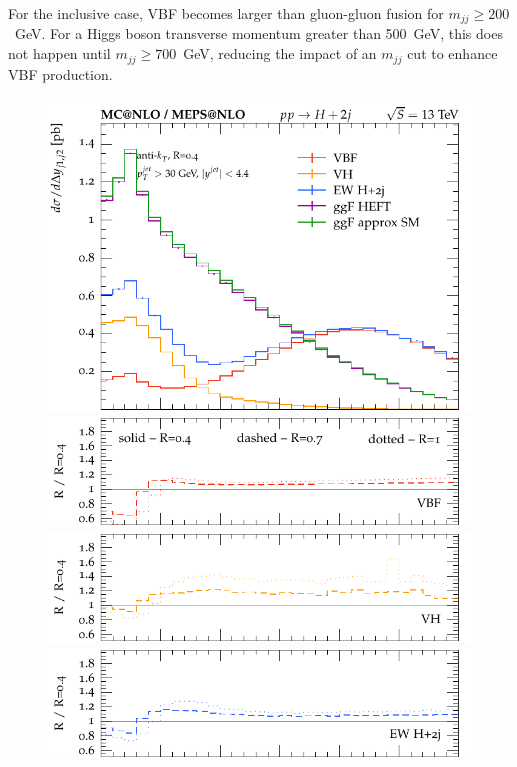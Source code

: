 \documentclass[10pt,prd,fleqn,superscriptaddress,notitlepage,nofootinbib,preprintnumbers,nobalancelastpage]{revtex4-1}
\newcommand{\VBF}{VBF\xspace}
\begin{document}
For the inclusive case, \VBF becomes larger than gluon-gluon fusion for $m_{jj} \ge 200$~GeV. For a Higgs boson transverse momentum greater than 500~GeV, this does not happen until $m_{jj} \ge 700$~GeV, reducing the impact of an $m_{jj}$ cut to enhance \VBF production.


\begin{figure}[p]
  \centering
  \begin{minipage}{.2925\textwidth}
    \includegraphics[width=\textwidth]{figures/channels/delta_y_jj12.pdf}
    \includegraphics[width=\textwidth]{figures/channels/delta_y_jj12_rVBF.pdf}
    \includegraphics[width=\textwidth]{figures/channels/delta_y_jj12_rVH.pdf}
    \includegraphics[width=\textwidth]{figures/channels/delta_y_jj12_rHJJ.pdf}

\end{minipage}
\end{figure}
\end{document}
